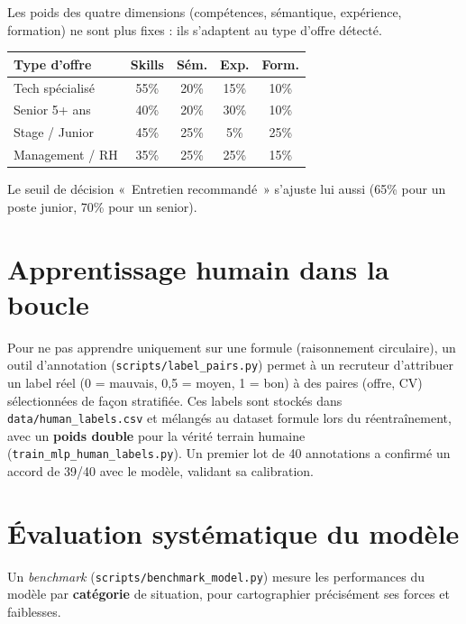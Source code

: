 \documentclass[12pt,a4paper]{report}
\newcommand{\filepath}[1]{\texttt{\small\textcolor{codeblue}{#1}}}
\begin{document}
Les poids des quatre dimensions (compétences, sémantique, expérience, formation)
ne sont plus fixes : ils s'adaptent au type d'offre détecté.

\begin{center}
\begin{tabular}{lcccc}
\toprule
\textbf{Type d'offre} & \textbf{Skills} & \textbf{Sém.} & \textbf{Exp.} & \textbf{Form.} \\
\midrule
Tech spécialisé   & 55\% & 20\% & 15\% & 10\% \\
Senior 5+ ans     & 40\% & 20\% & 30\% & 10\% \\
Stage / Junior    & 45\% & 25\% & 5\%  & 25\% \\
Management / RH   & 35\% & 25\% & 25\% & 15\% \\
\bottomrule
\end{tabular}
\end{center}

Le seuil de décision «~Entretien recommandé~» s'ajuste lui aussi (65\% pour un
poste junior, 70\% pour un senior).

\section{Apprentissage humain dans la boucle}

Pour ne pas apprendre uniquement sur une formule (raisonnement circulaire), un outil
d'annotation (\filepath{scripts/label\_pairs.py}) permet à un recruteur d'attribuer
un label réel (0 = mauvais, 0{,}5 = moyen, 1 = bon) à des paires (offre, CV)
sélectionnées de façon stratifiée. Ces labels sont stockés dans
\filepath{data/human\_labels.csv} et mélangés au dataset formule lors du
réentraînement, avec un \textbf{poids double} pour la vérité terrain humaine
(\filepath{train\_mlp\_human\_labels.py}). Un premier lot de 40 annotations a
confirmé un accord de 39/40 avec le modèle, validant sa calibration.

\section{Évaluation systématique du modèle}

Un \textit{benchmark} (\filepath{scripts/benchmark\_model.py}) mesure les
performances du modèle par \textbf{catégorie} de situation, pour cartographier
précisément ses forces et faiblesses.
\end{document}
